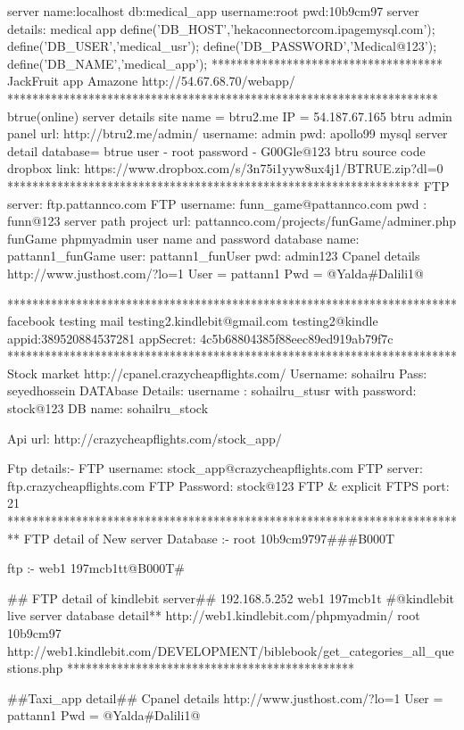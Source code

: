 server name:localhost
db:medical_app
username:root
pwd:10b9cm97
server details: medical app
define('DB_HOST','hekaconnectorcom.ipagemysql.com');
define('DB_USER','medical_usr');
define('DB_PASSWORD','Medical@123');
define('DB_NAME','medical_app');
*************************************
JackFruit app Amazone
http://54.67.68.70/webapp/
*********************************************************************
btrue(online) server details
site name = btru2.me
IP = 54.187.67.165
btru admin panel
url: http://btru2.me/admin/
username: admin
pwd: apollo99
mysql server detail
database= btrue
user - root
password - G00Gle@123
btru source code dropbox link: https://www.dropbox.com/s/3n75i1yyw8ux4j1/BTRUE.zip?dl=0
******************************************************************
FTP server:   ftp.pattannco.com
FTP username:   funn_game@pattannco.com
pwd : funn@123
server path
project url: pattannco.com/projects/funGame/adminer.php
funGame phpmyadmin user name and password
database name: pattann1_funGame
user: pattann1_funUser
pwd: admin123
Cpanel details
http://www.justhost.com/?lo=1
User  = pattann1
Pwd = @Yalda#Dalili1@ 

************************************************************************
facebook testing mail
testing2.kindlebit@gmail.com
testing2@kindle
appid:389520884537281
appSecret: 4c5b68804385f88eec89ed919ab79f7c
************************************************************************
Stock market 
http://cpanel.crazycheapflights.com/
Username: sohailru
Pass: seyedhossein
DATAbase Details:
username : sohailru_stusr 
with password: stock@123
DB name: sohailru_stock

Api url:
http://crazycheapflights.com/stock_app/

Ftp details:-
FTP username: stock_app@crazycheapflights.com
FTP server: ftp.crazycheapflights.com
FTP Password: stock@123
FTP & explicit FTPS port: 21
**************************************************************************
FTP detail of New server
Database :-
root
10b9cm9797###B000T

ftp :-
web1
197mcb1tt@B000T#

## FTP detail of kindlebit server##
192.168.5.252
web1
197mcb1t
#@kindlebit live server database detail**
http://web1.kindlebit.com/phpmyadmin/
root
10b9cm97
http://web1.kindlebit.com/DEVELOPMENT/biblebook/get_categories_all_questions.php
**********************************************


##Taxi_app detail##
Cpanel details
http://www.justhost.com/?lo=1
User = pattann1
Pwd = @Yalda#Dalili1@

